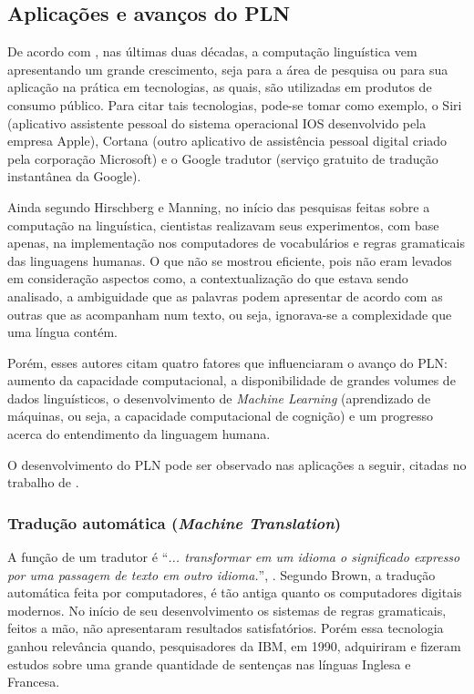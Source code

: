 \subsection{Aplicações e avanços do PLN}

De acordo com \cite{Hirschberg261}, nas últimas duas décadas, a computação linguística vem apresentando um grande crescimento, seja para a área de pesquisa ou para sua aplicação na prática em tecnologias, as quais, são utilizadas em produtos de consumo público. Para citar tais tecnologias, pode-se tomar como exemplo, o Siri (aplicativo assistente pessoal do sistema operacional IOS desenvolvido pela empresa Apple), Cortana (outro aplicativo de assistência pessoal digital criado pela corporação Microsoft) e o Google tradutor (serviço gratuito de tradução instantânea da Google).

Ainda segundo Hirschberg e Manning, no início das pesquisas feitas sobre a computação na linguística, cientistas realizavam seus experimentos, com base apenas, na implementação nos computadores de vocabulários e regras gramaticais das linguagens humanas. O que não se mostrou eficiente, pois não eram levados em consideração aspectos como, a contextualização do que estava sendo analisado, a ambiguidade que as palavras podem apresentar de acordo com as outras que as acompanham num texto, ou seja, ignorava-se a complexidade que uma língua contém.

Porém, esses autores citam quatro fatores que influenciaram o avanço do PLN: aumento da capacidade computacional, a disponibilidade de grandes volumes de dados linguísticos, o desenvolvimento de  \textit{Machine Learning} (aprendizado de máquinas, ou seja, a capacidade computacional de cognição) e um progresso acerca do entendimento da linguagem humana.

O desenvolvimento do PLN pode ser observado nas aplicações a seguir, citadas no trabalho de \cite{Hirschberg261}.

\subsubsection{Tradução automática (\textit{Machine Translation})}

A função de um tradutor é “\textit{... transformar em um idioma o significado expresso por uma passagem de texto em outro idioma.}”, \cite[tradução do autor]{Brown:90}. 
Segundo Brown, a tradução automática feita por computadores, é tão antiga quanto os computadores digitais modernos. No início de seu desenvolvimento os sistemas de regras gramaticais, feitos a mão, não apresentaram resultados satisfatórios. Porém essa tecnologia ganhou relevância quando, pesquisadores da IBM, em 1990, adquiriram e fizeram estudos sobre uma grande quantidade de sentenças nas línguas Inglesa e Francesa. 

